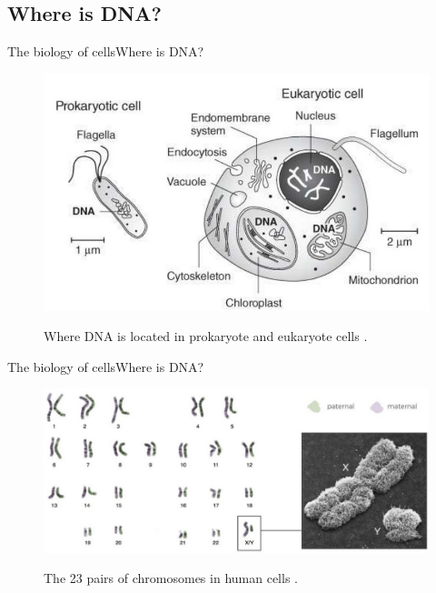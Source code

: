 \documentclass[10pt]{beamer}
\begin{document}
{%
\subsection{Where is DNA?}

\begin{frame}{The biology of cells}{Where is DNA?}
\begin{figure}[]
 \centering
    \includegraphics[width=\textwidth,height=0.6\textheight,keepaspectratio]{img/introduction/bio1.jpg}
    \label{img:mot2}
    \caption{Where DNA is located in prokaryote and eukaryote cells \cite{archibald2018genomics}.}
\end{figure}
\end{frame}


\begin{frame}{The biology of cells}{Where is DNA?}
\begin{figure}[]
 \centering
    \includegraphics[width=\textwidth,height=0.6\textheight,keepaspectratio]{img/introduction/bio2.jpg}
    \label{img:mot2}
    \caption{The 23 pairs of chromosomes in human cells \cite{archibald2018genomics}.}
\end{figure}
\end{frame}

}
\end{document}
